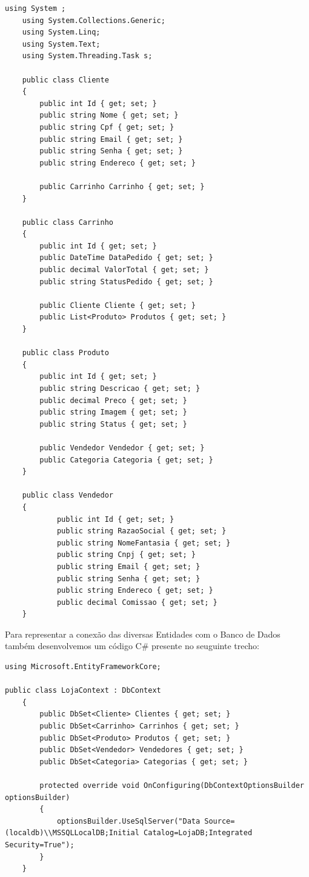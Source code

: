 \documentclass[
	12pt,				%
	openright,			%
	twoside,			%
	a4paper,			%
	english,			%
	brazil				%
	]{abntex2}
\begin{document}
\begin{lstlisting}[language={[Sharp]C}, caption=Entidades do código C\#, label=lst:entidades]
	using System ; 
	using System.Collections.Generic;  
	using System.Linq;
	using System.Text;  
	using System.Threading.Task s;
	
	public class Cliente
	{
		public int Id { get; set; }
		public string Nome { get; set; }
		public string Cpf { get; set; }
		public string Email { get; set; }
		public string Senha { get; set; }
		public string Endereco { get; set; }
	
		public Carrinho Carrinho { get; set; }
	}
	
	public class Carrinho
	{
		public int Id { get; set; }
		public DateTime DataPedido { get; set; }
		public decimal ValorTotal { get; set; }
		public string StatusPedido { get; set; }
	
		public Cliente Cliente { get; set; }
		public List<Produto> Produtos { get; set; }
	}
	
	public class Produto
	{
		public int Id { get; set; }
		public string Descricao { get; set; }
		public decimal Preco { get; set; }
		public string Imagem { get; set; }
		public string Status { get; set; }
	
		public Vendedor Vendedor { get; set; }
		public Categoria Categoria { get; set; }
	}
	
	public class Vendedor
	{
			public int Id { get; set; }
			public string RazaoSocial { get; set; }
			public string NomeFantasia { get; set; }
			public string Cnpj { get; set; }
			public string Email { get; set; }
			public string Senha { get; set; }
			public string Endereco { get; set; }
			public decimal Comissao { get; set; }
	}
\end{lstlisting}

Para representar a conexão das diversas Entidades com o Banco de Dados também desenvolvemos um código C\# presente no seuguinte trecho:


\begin{lstlisting}[language={[Sharp]C}, caption=Conexão com a Data Base, label=lst:conexao]
using Microsoft.EntityFrameworkCore;

public class LojaContext : DbContext
	{
		public DbSet<Cliente> Clientes { get; set; }
		public DbSet<Carrinho> Carrinhos { get; set; }
		public DbSet<Produto> Produtos { get; set; }
		public DbSet<Vendedor> Vendedores { get; set; }
		public DbSet<Categoria> Categorias { get; set; }

		protected override void OnConfiguring(DbContextOptionsBuilder optionsBuilder)
		{
			optionsBuilder.UseSqlServer("Data Source=(localdb)\\MSSQLLocalDB;Initial Catalog=LojaDB;Integrated Security=True");
		}
	}
\end{lstlisting}
\end{document}
